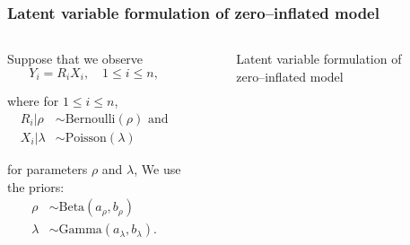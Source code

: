\documentclass{beamer}
\begin{document}
\begin{frame}
	\frametitle{Latent variable formulation of zero--inflated model}
			
	\begin{columns}
		\begin{column}{0.7 \textwidth}
							
			Suppose that we observe
			$$
			Y_i = R_i X_i, \quad 1\le i\le n,
			$$
							
			\noindent where for $1\le i\le n$,
			\begin{align*} 
				R_i | \rho & \sim \text{Bernoulli}(\rho) \text{ and} \\
				X_i | \lambda & \sim \text{Poisson}(\lambda)            
			\end{align*}
							
			\noindent for parameters $\rho$ and $\lambda$,
			We use the priors:
			\begin{align*} 
				\rho    & \sim \text{Beta}(a_\rho, b_\rho)         \\
				\lambda & \sim \text{Gamma}(a_\lambda, b_\lambda). 
			\end{align*}
		\end{column}
				
		\begin{column}{0.2 \textwidth}
			\begin{figure}
				\caption{Latent variable formulation of zero--inflated model}
			\end{figure}
		\end{column}
	\end{columns}
\end{frame}
\end{document}
